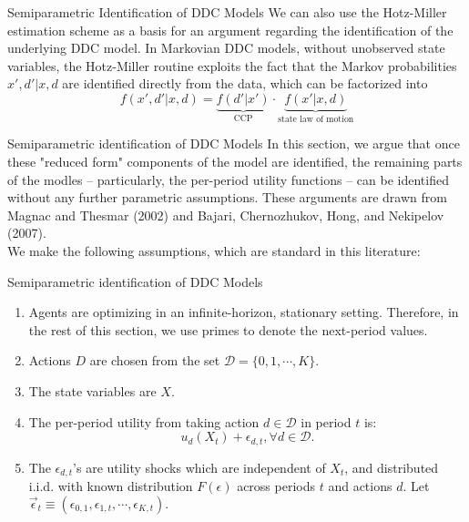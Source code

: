 \documentclass[xcolor=pdftex,dvipsnames,table,mathserif]{beamer}
\begin{document}
\begin{frame}{Semiparametric Identification of DDC Models}
\vspace{3mm}
We can also use the Hotz-Miller estimation scheme as a basis for an argument regarding the identification of the underlying DDC model. In Markovian DDC models, without unobserved state variables, the Hotz-Miller routine exploits the fact that the Markov probabilities $x', d'|x, d$ are identified directly from the data, which can be factorized into
\begin{equation}
f(x',d'|x,d) = \underbrace{f(d'|x')}_{\text{CCP}} \cdot \underbrace{f(x'|x,d)}_{\text{state law of motion}}
\end{equation}
\end{frame}

\begin{frame}{Semiparametric identification of DDC Models}
In this section, we argue that once these "reduced form" components of the model are identified, the remaining parts of the modles -- particularly, the per-period utility functions -- can be identified without any further parametric assumptions. These arguments are drawn from Magnac and Thesmar (2002) and Bajari, Chernozhukov, Hong, and Nekipelov (2007).\\
We make the following assumptions, which are standard in this literature:
\end{frame}

\begin{frame}{Semiparametric identification of DDC Models}
\begin{enumerate}
\item Agents are optimizing in an infinite-horizon, stationary setting. Therefore, in the rest of this section, we use primes to denote the next-period values. 
\item Actions $D$ are chosen from the set $\mathcal{D} = \{0,1, \cdots, K\}$.
\item The state variables are $X$.
\item The per-period utility from taking action $d \in \mathcal{D}$ in period $t$ is:
\begin{equation*}
u_d(X_t) +\epsilon_{d,t}, \forall d \in \mathcal{D}.
\end{equation*}
\item The $\epsilon_{d,t}$'s are utility shocks which are independent of $X_t$, and distributed i.i.d. with known distribution $F(\epsilon)$ across periods $t$ and actions $d$. Let $\vec \epsilon_t \equiv (\epsilon_{0,1}, \epsilon_{1,t}, \cdots, \epsilon_{K,t}).$ \\
\end{enumerate}
\end{frame}
\end{document}
